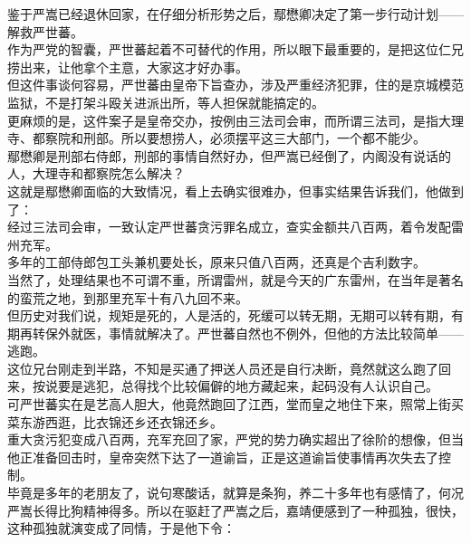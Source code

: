 \begin{multicols}{\theparacolNo}
鉴于严嵩已经退休回家，在仔细分析形势之后，鄢懋卿决定了第一步行动计划——解救严世蕃。\\

作为严党的智囊，严世蕃起着不可替代的作用，所以眼下最重要的，是把这位仁兄捞出来，让他拿个主意，大家这才好办事。\\

但这件事谈何容易，严世蕃由皇帝下旨查办，涉及严重经济犯罪，住的是京城模范监狱，不是打架斗殴关进派出所，等人担保就能搞定的。\\

更麻烦的是，这件案子是皇帝交办，按例由三法司会审，而所谓三法司，是指大理寺、都察院和刑部。所以要想捞人，必须摆平这三大部门，一个都不能少。\\

鄢懋卿是刑部右侍郎，刑部的事情自然好办，但严嵩已经倒了，内阁没有说话的人，大理寺和都察院怎么解决？\\

这就是鄢懋卿面临的大致情况，看上去确实很难办，但事实结果告诉我们，他做到了：\\

经过三法司会审，一致认定严世蕃贪污罪名成立，查实金额共八百两，着令发配雷州充军。\\

多年的工部侍郎包工头兼机要处长，原来只值八百两，还真是个吉利数字。\\

当然了，处理结果也不可谓不重，所谓雷州，就是今天的广东雷州，在当年是著名的蛮荒之地，到那里充军十有八九回不来。\\

但历史对我们说，规矩是死的，人是活的，死缓可以转无期，无期可以转有期，有期再转保外就医，事情就解决了。严世蕃自然也不例外，但他的方法比较简单——逃跑。\\

这位兄台刚走到半路，不知是买通了押送人员还是自行决断，竟然就这么跑了回来，按说要是逃犯，总得找个比较偏僻的地方藏起来，起码没有人认识自己。\\

可严世蕃实在是艺高人胆大，他竟然跑回了江西，堂而皇之地住下来，照常上街买菜东游西逛，比衣锦还乡还衣锦还乡。\\

重大贪污犯变成八百两，充军充回了家，严党的势力确实超出了徐阶的想像，但当他正准备回击时，皇帝突然下达了一道谕旨，正是这道谕旨使事情再次失去了控制。\\

毕竟是多年的老朋友了，说句寒酸话，就算是条狗，养二十多年也有感情了，何况严嵩长得比狗精神得多。所以在驱赶了严嵩之后，嘉靖便感到了一种孤独，很快，这种孤独就演变成了同情，于是他下令：\\


\end{multicols}
